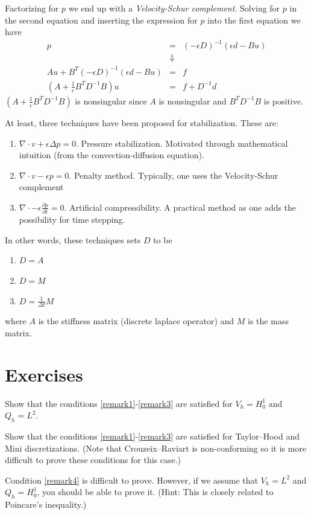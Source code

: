 Factorizing for $p$ we end up with a \emph{Velocity-Schur complement}. Solving for $p$ in the second equation and inserting the expression for $p$ into the first equation we have
\begin{eqnarray*}
p &=& (-\epsilon D)^{-1}(\epsilon d - Bu)\\
&\Downarrow&\\
Au + B^T(-\epsilon D)^{-1}(\epsilon d-Bu) &=& f\\
(A + \frac{1}{\epsilon}B^TD^{-1}B)u &=& f + D^{-1}d
\end{eqnarray*}
$(A + \frac{1}{\epsilon}B^TD^{-1}B)$ is nonsingular since $A$ is nonsingular and $B^TD^{-1}B$ is positive.

At least, three techniques have been proposed for stabilization. These are:
\begin{enumerate}
\item $\nabla\cdot v + \epsilon\Delta p = 0 $. Pressure stabilization. Motivated through mathematical intuition (from the convection-diffusion equation).
\item $\nabla\cdot v  -\epsilon p = 0 $. Penalty method. Typically, one uses the Velocity-Schur complement
\item $\nabla\cdot  -\epsilon\frac{\partial p}{\partial t} = 0 $. 
	Artificial compressibility. A practical method as one adds the
  possibility for time stepping.
\end{enumerate}

\noindent
In other words, these techniques sets $D$ to be
\begin{enumerate}
	\item $D=A$
	\item $D=M$
	\item $D=\frac{1}{\Delta t}M$
\end{enumerate}
where $A$ is the stiffness matrix (discrete laplace operator) and $M$ is the mass matrix.


\section{Exercises}

\begin{exercise}
Show that the conditions \eqref{remark1}-\eqref{remark3} are satisfied for
$V_h = H^1_0$ and $Q_h=L^2$.
\end{exercise}
\begin{exercise}
Show that the conditions \eqref{remark1}-\eqref{remark3} are satisfied for
Taylor--Hood and Mini discretizations.
(Note that Crouzeix--Raviart is non-conforming so it is more difficult to prove these conditions
for this case.)
\end{exercise}
\begin{exercise}
Condition \eqref{remark4} is difficult to prove. However, if we assume that
$V_h = L^2$ and $Q_h=H^1_0$, you should be able to prove it. (Hint: This
is closely related to Poincare's inequality.)
\end{exercise}

